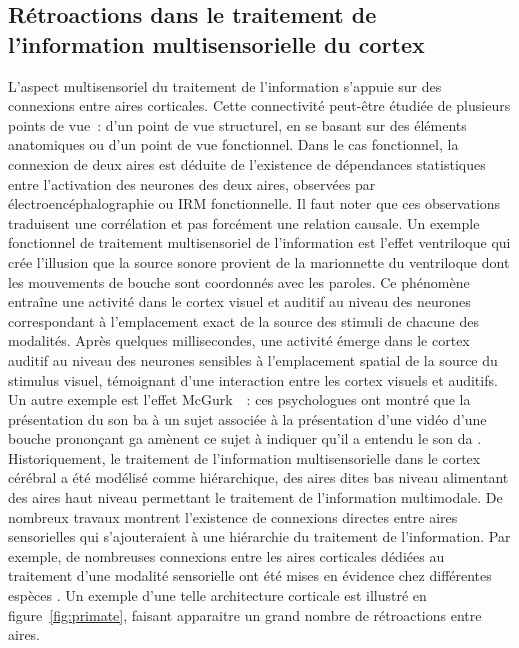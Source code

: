\documentclass[../main]{subfiles}
\begin{document}
\subsection{Rétroactions dans le traitement de l'information multisensorielle du cortex}

L'aspect multisensoriel du traitement de l'information s'appuie sur des connexions entre aires corticales.
Cette connectivité peut-être étudiée de plusieurs points de vue~: d'un point de vue structurel, en se basant sur des éléments anatomiques ou d'un point de vue fonctionnel.
Dans le cas fonctionnel, la connexion de deux aires est déduite de l'existence de dépendances statistiques entre l'activation des neurones des deux aires, observées par électroencéphalographie ou IRM fonctionnelle. Il faut noter que ces observations traduisent une corrélation et pas forcément une relation causale. 
Un exemple fonctionnel de traitement multisensoriel de l'information est l'effet ventriloque \parencite{Bonath2007NeuralBO} qui crée l'illusion que la source sonore provient de la marionnette du ventriloque dont les mouvements de bouche sont coordonnés avec les paroles. 
Ce phénomène entraîne une activité dans le cortex visuel et auditif au niveau des neurones correspondant à l'emplacement exact de la source des stimuli de chacune des modalités.
Après quelques millisecondes, une activité émerge dans le cortex auditif au niveau des neurones sensibles à l'emplacement spatial de la source du stimulus visuel, témoignant d'une interaction entre les cortex visuels et auditifs.
Un autre exemple est l'effet McGurk~\parencite{McGurk1976HearingLA}~: ces psychologues ont montré que la présentation du son \og ba \fg{} à un sujet associée à la présentation d'une vidéo d'une bouche prononçant \og ga \fg{} amènent ce sujet à indiquer qu'il a entendu le son \og da \fg{}.
Historiquement, le traitement de l'information multisensorielle dans le cortex cérébral a été modélisé comme hiérarchique, des aires dites bas niveau alimentant des aires haut niveau permettant le traitement de l'information multimodale. 
De nombreux travaux montrent l'existence de connexions directes entre aires sensorielles qui s'ajouteraient à une hiérarchie du traitement de l'information. Par exemple, de nombreuses connexions entre les aires corticales dédiées au traitement d'une modalité sensorielle ont été mises en évidence chez différentes espèces \parencite{primate_cortex_91,Calvert2004MultisensoryIM, Cappe2009MultisensoryAP,Foxe2005TheCF,Schroeder2005MultisensoryCT}. Un exemple d'une telle architecture corticale est illustré en figure~\ref{fig:primate}, faisant apparaitre un grand nombre de rétroactions entre aires.
\end{document}
